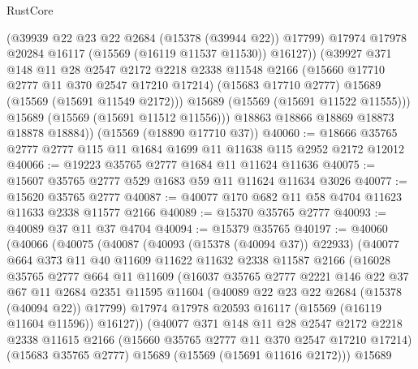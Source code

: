 \begin{lexlean}{RustCore}
\begin{coremodule}
                (@39939 @22 @23 @22 @2684 (@15378 (@39944 @22)) @17799)
                @17974
                @17978
                @20284
                @16117
                (@15569 (@16119 @11537 @11530))
                @16127))
            (@39927
              @371
              @148
              @11
              @28
              @2547
              @2172
              @2218
              @2338
              @11548
              @2166
              (@15660 @17710 @2777 @11 @370 @2547 @17210 @17214)
              (@15683 @17710 @2777)
              @15689
              (@15569 (@15691 @11549 @2172)))
            @15689
            (@15569 (@15691 @11522 @11555)))
          @15689
          (@15569 (@15691 @11512 @11556)))
        @18863
        @18866
        @18869
        @18873
        @18878
        @18884))
    (@15569 (@18890 @17710 @37))
@40060 := @18666 @35765 @2777 @2777 @115 @11 @1684 @1699 @11 @11638 @115 @2952 @2172 @12012
@40066 := @19223 @35765 @2777 @1684 @11 @11624 @11636
@40075 := @15607 @35765 @2777 @529 @1683 @59 @11 @11624 @11634 @3026
@40077 := @15620 @35765 @2777
@40087 := @40077 @170 @682 @11 @58 @4704 @11623 @11633 @2338 @11577 @2166
@40089 := @15370 @35765 @2777
@40093 := @40089 @37 @11 @37 @4704
@40094 := @15379 @35765
@40197 := @40060
    (@40066
      (@40075
        (@40087
          (@40093 (@15378 (@40094 @37)) @22933)
          (@40077
            @664
            @373
            @11
            @40
            @11609
            @11622
            @11632
            @2338
            @11587
            @2166
            (@16028
              @35765
              @2777
              @664
              @11
              @11609
              (@16037
                @35765
                @2777
                @2221
                @146
                @22
                @37
                @67
                @11
                @2684
                @2351
                @11595
                @11604
                (@40089 @22 @23 @22 @2684 (@15378 (@40094 @22)) @17799)
                @17974
                @17978
                @20593
                @16117
                (@15569 (@16119 @11604 @11596))
                @16127))
            (@40077
              @371
              @148
              @11
              @28
              @2547
              @2172
              @2218
              @2338
              @11615
              @2166
              (@15660 @35765 @2777 @11 @370 @2547 @17210 @17214)
              (@15683 @35765 @2777)
              @15689
              (@15569 (@15691 @11616 @2172)))
            @15689

\end{coremodule}
\end{lexlean}
